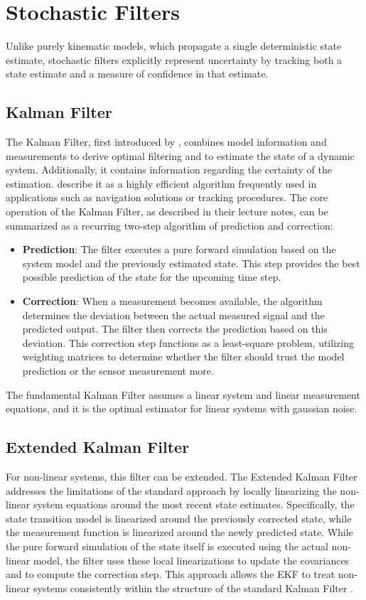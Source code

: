 \section{Stochastic Filters} 
Unlike purely kinematic models, which propagate a single deterministic state estimate, stochastic filters explicitly represent uncertainty by tracking both a state estimate and a measure of confidence in that estimate.

\subsection{Kalman Filter}
\label{subsec:kalmanfilterbackground}
The Kalman Filter, first introduced by \textcite{Kalman1960}, combines model information and measurements to derive optimal filtering and to estimate the state of a dynamic system. Additionally, it contains information regarding the certainty of the estimation. \cite{ValleryDoerschel2025RTSkript} describe it as a highly efficient algorithm frequently used in applications such as navigation solutions or tracking procedures. The core operation of the Kalman Filter, as described in their lecture notes, can be summarized as a recurring two-step algorithm of prediction and correction:
\begin{itemize}
    \item \textbf{Prediction}: The filter executes a pure forward simulation based on the system model and the previously estimated state. This step provides the best possible prediction of the state for the upcoming time step.
    \item \textbf{Correction}: When a measurement becomes available, the algorithm determines the deviation between the actual measured signal and the predicted output. The filter then corrects the prediction based on this deviation. This correction step functions as a least-square problem, utilizing weighting matrices to determine whether the filter should trust the model prediction or the sensor measurement more.
\end{itemize}
The fundamental Kalman Filter assumes a linear system and linear measurement equations, and it is the optimal estimator for linear systems with gaussian noise.


\subsection{Extended Kalman Filter}

For non-linear systems, this filter can be extended. The Extended Kalman Filter \parencite{Schmidt1966EKF} addresses the limitations of the standard approach by locally linearizing the non-linear system equations around the most recent state estimates. Specifically, the state transition model is linearized around the previously corrected state, while the measurement function is linearized around the newly predicted state. While the pure forward simulation of the state itself is executed using the actual non-linear model, the filter uses these local linearizations to update the covariances and to compute the correction step. This approach allows the EKF to treat non-linear systems consistently within the structure of the standard Kalman Filter \parencite[445]{ValleryDoerschel2025RTSkript}.


